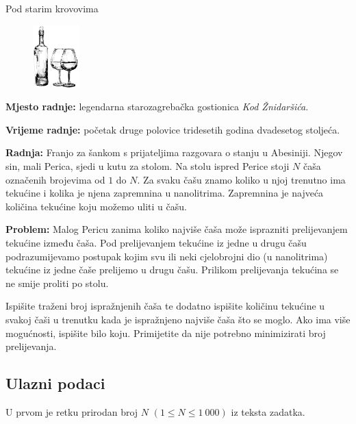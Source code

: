 \begin{statement}[
  problempoints=50,
  timelimit=1 sekunda,
  memorylimit=512 MiB,
]{Pod starim krovovima}

\setlength\intextsep{-0.1cm}
\begin{figure}
\centering
\includegraphics[width=0.16\textwidth]{img/psk.png}
\end{figure}

\textbf{Mjesto radnje:} legendarna starozagrebačka gostionica \textit{Kod
Žnidaršića}.

\textbf{Vrijeme radnje:} početak druge polovice tridesetih godina dvadesetog
stoljeća.

\textbf{Radnja:} Franjo za šankom s prijateljima razgovara o stanju u
Abesiniji. Njegov sin, mali Perica, sjedi u kutu za stolom. Na stolu ispred
Perice stoji $N$ čaša označenih brojevima od $1$ do $N$. Za svaku čašu znamo
koliko u njoj trenutno ima tekućine i kolika je njena zapremnina u nanolitrima.
Zapremnina je najveća količina tekućine koju možemo uliti u čašu.

\textbf{Problem:} Malog Pericu zanima koliko najviše čaša može isprazniti
prelijevanjem tekućine između čaša. Pod prelijevanjem tekućine iz jedne u
drugu čašu podrazumijevamo postupak kojim svu ili neki cjelobrojni dio (u
nanolitrima) tekućine iz jedne čaše prelijemo u drugu čašu. Prilikom
prelijevanja tekućina se ne smije proliti po stolu.

Ispišite traženi broj ispražnjenih čaša te dodatno ispišite količinu tekućine u
svakoj čaši u trenutku kada je ispražnjeno najviše čaša što se moglo.  Ako
ima više mogućnosti, ispišite bilo koju. Primijetite da nije potrebno
minimizirati broj prelijevanja.

\subsection*{Ulazni podaci}
U prvom je retku prirodan broj $N$ $(1 \le N \le 1\ 000)$ iz teksta zadatka.


\end{statement}
